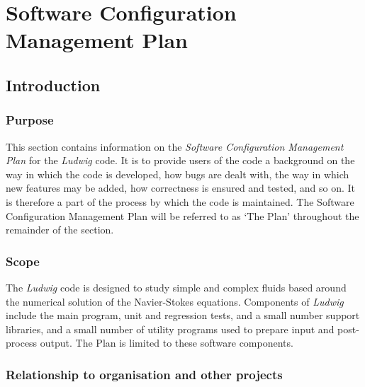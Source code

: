 %
%
%
%
%
%


\section{Software Configuration Management Plan}

\subsection{Introduction}

\subsubsection{Purpose}

This section contains information on the \textit{Software Configuration
Management Plan} for the \textit{Ludwig} code.
It is to provide users of the code a background on the way in which
the code is developed, how bugs are dealt with, the way in which
new features may be added, how correctness is ensured and tested, and so on.
It is therefore a part
of the process by which the code is maintained. The Software Configuration
Management Plan will be referred to as `The Plan' throughout the remainder
of the section.

\subsubsection{Scope}

The \textit{Ludwig} code is designed to study simple and complex fluids
based around the numerical solution of the Navier-Stokes equations.
Components of \textit{Ludwig} include the main program, unit and
regression tests, and a small number support libraries, and a small
number of utility programs used to prepare
input and post-process output. The Plan is limited to these
software components.

\subsubsection{Relationship to organisation and other projects}

